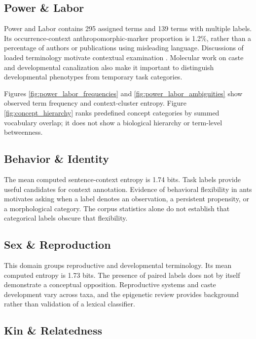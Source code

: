 \documentclass[
]{article}
\numberwithin{equation}{section}
\begin{document}
\subsection{Power \& Labor}\label{power-labor}

Power and Labor contains 295 assigned terms and 139 terms with multiple
labels. Its occurrence-context anthropomorphic-marker proportion is
1.2\%, rather than a percentage of authors or publications using
misleading language. Discussions of loaded terminology motivate
contextual examination \citep{herbers2006, herbers2007}. Molecular work
on caste \citep{sumner2018molecular} and developmental canalization
\citep{qiu2022canalized} also make it important to distinguish
developmental phenotypes from temporary task categories.

Figures \ref{fig:power_labor_frequencies} and
\ref{fig:power_labor_ambiguities} show observed term frequency and
context-cluster entropy. Figure \ref{fig:concept_hierarchy} ranks
predefined concept categories by summed vocabulary overlap; it does not
show a biological hierarchy or term-level betweenness.

\subsection{Behavior \& Identity}\label{behavior-identity}

The mean computed sentence-context entropy is 1.74 bits. Task labels
provide useful candidates for context annotation. Evidence of behavioral
flexibility in ants \citep{ravary2007, gordon2010} motivates asking when
a label denotes an observation, a persistent propensity, or a
morphological category. The corpus statistics alone do not establish
that categorical labels obscure that flexibility.

\subsection{Sex \& Reproduction}\label{sex-reproduction}

This domain groups reproductive and developmental terminology. Its mean
computed entropy is 1.73 bits. The presence of paired labels does not by
itself demonstrate a conceptual opposition. Reproductive systems and
caste development vary across taxa, and the epigenetic review
\citep{oldroyd2021epigenetics} provides background rather than
validation of a lexical classifier.

\subsection{Kin \& Relatedness}\label{kin-relatedness}
\end{document}
